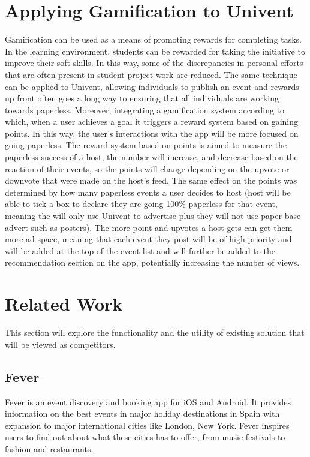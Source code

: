\section{Applying Gamification to Univent}
\label{gamification}
Gamification can be used as a means of promoting rewards for completing tasks. In the learning environment, students can be rewarded for taking the initiative to improve their soft skills. In this way, some of the discrepancies in personal efforts that are often present in student project work are reduced.
The same technique can be applied to Univent, allowing individuals to publish an event and rewards up front often goes a long way to ensuring that all individuals are working towards paperless. Moreover, integrating a gamification system according to which, when a user achieves a goal it triggers a reward system based on gaining points. In this way, the user’s interactions with the app will be more focused on going paperless. The reward system based on points is aimed to measure the paperless success of a host, the number will increase, and decrease based on the reaction of their events, so the points will change depending on the upvote or downvote that were made on the host's feed. The same effect on the points was determined by how many paperless events a user decides to host (host will be able to tick a box to declare they are going 100\% paperless for that event, meaning the will only use Univent to advertise  plus they will not use paper base advert such as posters). The more point and upvotes a host gets can get them more ad space, meaning that each event they post will be of high priority and will be added at the top of the event list and will further be added to the recommendation section on the app, potentially increasing the number of views.

\section{Related Work}
\label{similar_app}
This section will explore the functionality and the utility of existing solution that will be viewed as competitors.

\subsection{Fever}
Fever is an event discovery and booking app for iOS and Android. It provides information on the best events in major holiday destinations in Spain with expansion to major international cities like London, New York. Fever inspires users to find out about what these cities has to offer, from music festivals to fashion and restaurants.

